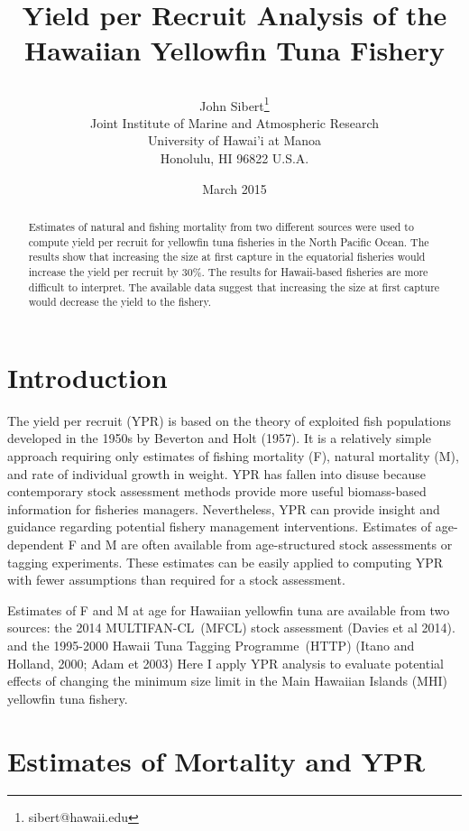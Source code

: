 \documentclass[12pt,letterpaper,twoside]{article}
\title{Yield per Recruit Analysis of the Hawaiian
Yellowfin Tuna Fishery
\date{March 2015}}
\author{
John Sibert\thanks{sibert@hawaii.edu}\\
Joint Institute of Marine and Atmospheric Research\\
University of Hawai'i at Manoa\\
Honolulu, HI  96822 U.S.A.\\[0.125in]
}
\newcommand\MFCL{MULTIFAN-CL}
\newcommand\HTTP{Hawaii Tuna Tagging Programme}
\begin{document}
\maketitle

\begin{abstract}
Estimates of natural and fishing mortality from two different sources
were used to compute yield per recruit for yellowfin tuna fisheries in
the North Pacific Ocean. The results show that increasing the size at
first capture in the equatorial fisheries would increase the yield per
recruit by 30\%. The results for Hawaii-based fisheries are more
difficult to interpret. The available data suggest that increasing the
size at first capture would decrease the yield to the fishery.
\end{abstract}

\section*{Introduction}
The yield per recruit (YPR) is based on the theory of exploited fish
populations developed in the 1950s
by Beverton and Holt (1957). It is a relatively simple
approach requiring only estimates of fishing mortality (F), natural
mortality (M), and rate of individual growth in weight. YPR has fallen into
disuse because contemporary stock assessment methods provide more useful
biomass-based
information for fisheries managers. 
Nevertheless, YPR can provide insight and guidance regarding potential
fishery management interventions.
Estimates of age-dependent F and M are often available from
age-structured stock
assessments or tagging experiments. These estimates can be easily
applied to computing YPR with fewer assumptions than required for a
stock assessment. 

Estimates of F and M at age for Hawaiian yellowfin tuna are available
from two sources: 
the 2014 \MFCL\ (MFCL) stock assessment (Davies et al 2014).
and 
the 1995-2000 \HTTP\ (HTTP) (Itano and Holland, 2000; Adam et 2003) 
Here I
apply YPR analysis to evaluate potential effects of changing the
minimum size limit in the Main Hawaiian Islands (MHI) yellowfin tuna
fishery.

\section*{Estimates of Mortality and YPR}
\end{document}
